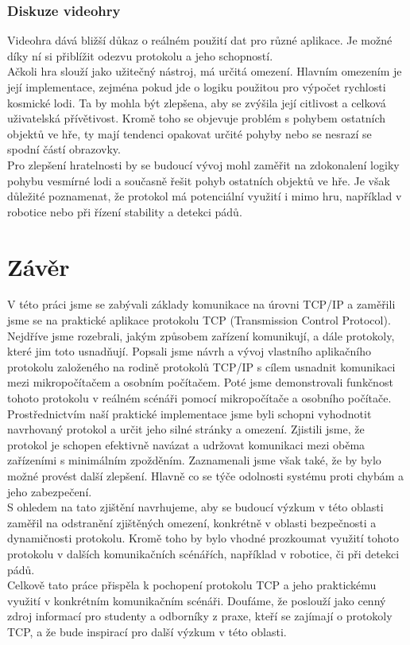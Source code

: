 \documentclass[12pt]{report}			%
\begin{document}
\subsection{Diskuze videohry}

Videohra dává bližší důkaz o reálném použití dat pro různé aplikace. Je možné díky ní si přiblížit odezvu protokolu a jeho schopností. 
\\
Ačkoli hra slouží jako užitečný nástroj, má určitá omezení. Hlavním omezením je její implementace, zejména pokud jde o logiku použitou pro výpočet rychlosti kosmické lodi. Ta by mohla být zlepšena, aby se zvýšila její citlivost a celková uživatelská přívětivost. Kromě toho se objevuje problém s pohybem ostatních objektů ve hře, ty mají tendenci opakovat určité pohyby nebo se nesrazí se spodní částí obrazovky.
\\
Pro zlepšení hratelnosti by se budoucí vývoj mohl zaměřit na zdokonalení logiky pohybu vesmírné lodi a současně řešit pohyb ostatních objektů ve hře. Je však důležité poznamenat, že protokol má potenciální využití i mimo hru, například v robotice nebo při řízení stability a detekci pádů.



	\chapter*{Závěr}
	
		V této práci jsme se zabývali základy komunikace na úrovni TCP/IP a zaměřili jsme se na praktické aplikace protokolu TCP (Transmission Control Protocol). Nejdříve jsme rozebrali, jakým způsobem zařízení komunikují, a dále protokoly, které jim toto usnadňují. Popsali jsme návrh a vývoj vlastního aplikačního protokolu založeného na rodině protokolů TCP/IP s cílem usnadnit komunikaci mezi mikropočítačem a osobním počítačem. Poté jsme demonstrovali funkčnost tohoto protokolu v reálném scénáři pomocí mikropočítače a osobního počítače.
\\
Prostřednictvím naší praktické implementace jsme byli schopni vyhodnotit navrhovaný protokol a určit jeho silné stránky a omezení. Zjistili jsme, že protokol je schopen efektivně navázat a udržovat komunikaci mezi oběma zařízeními s minimálním zpožděním. Zaznamenali jsme však také, že by bylo možné provést další zlepšení. Hlavně co se týče odolnosti systému proti chybám a jeho zabezpečení.  
\\
S ohledem na tato zjištění navrhujeme, aby se budoucí výzkum v této oblasti zaměřil na odstranění zjištěných omezení, konkrétně v oblasti bezpečnosti a dynamičnosti protokolu. Kromě toho by bylo vhodné prozkoumat využití tohoto protokolu v dalších komunikačních scénářích, například v robotice, či při detekci pádů.
\\
Celkově tato práce přispěla k pochopení protokolu TCP a jeho praktickému využití v konkrétním komunikačním scénáři. Doufáme, že poslouží jako cenný zdroj informací pro studenty a odborníky z praxe, kteří se zajímají o protokoly TCP, a že bude inspirací pro další výzkum v této oblasti.
	
\end{document}
